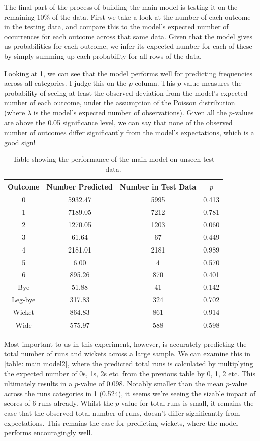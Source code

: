 The final part of the process of building the main model is testing it on the remaining 10\% of the data. First we take a look at the number of each outcome in the testing data, and compare this to the model's expected number of occurrences for each outcome across that same data. Given that the model gives us probabilities for each outcome, we infer its expected number for each of these by simply summing up each probability for all rows of the data.

Looking at \cref{table: main model1}, we can see that the model performs well for predicting frequencies across all categories. I judge this on the $p$ column. This $p$-value measures the probability of seeing at least the observed deviation from the model's expected number of each outcome, under the assumption of the Poisson distribution (where $\lambda$ is the model's expected number of observations). Given all the $p$-values are above the 0.05 significance level, we can say that none of the observed number of outcomes differ significantly from the model's expectations, which is a good sign!

\begin{table}[ht]
\centering
\begin{tabular} {c c c c} \toprule
    {Outcome} & {Number Predicted} & {Number in Test Data} & {$p$} \\ \midrule
     0 & 5932.47 & 5995 & 0.413 \\
     1 & 7189.05 & 7212 & 0.781 \\
     2 & 1270.05 & 1203 & 0.060 \\
     3 & 61.64 & 67 & 0.449 \\
     4 & 2181.01 & 2181 & 0.989 \\
     5 & 6.00 & 4 & 0.570 \\
     6 & 895.26 & 870 & 0.401 \\ \midrule
     Bye & 51.88 & 41 & 0.142 \\
     Leg-bye & 317.83 & 324 & 0.702 \\
     Wicket & 864.83 & 861 & 0.914 \\
     Wide & 575.97 & 588 & 0.598 \\ \bottomrule
\end{tabular}
\caption{Table showing the performance of the main model on unseen test data.}
\label{table: main model1}
\end{table}

Most important to us in this experiment, however, is accurately predicting the total number of runs and wickets across a large sample. We can examine this in \cref{table: main model2}, where the predicted total runs is calculated by multiplying the expected number of 0s, 1s, 2s etc. from the previous table by 0, 1, 2 etc. This ultimately results in a $p$-value of 0.098. Notably smaller than the mean $p$-value across the runs categories in \cref{table: main model1} (0.524), it seems we're seeing the sizable impact of scores of 6 runs already. Whilst the $p$-value for total runs is small, it remains the case that the observed total number of runs, doesn't differ significantly from expectations. This remains the case for predicting wickets, where the model performs encouragingly well.

